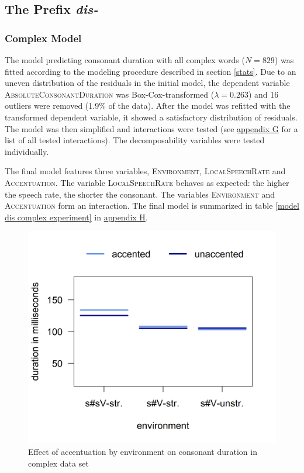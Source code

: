 \subsection{The Prefix \textit{dis-} }


\subsubsection{Complex Model}

The model predicting consonant duration with all complex words ($N=829$) was fitted according to the modeling procedure described in section \ref{stats}. Due to an uneven distribution of the residuals in the initial model, the dependent variable \textsc{AbsoluteConsonantDuration} was Box-Cox-transformed ($\lambda = 0.263$) and 16 outliers were removed (1.9\% of the data). After the model was refitted with the transformed dependent variable, it showed a satisfactory distribution of residuals. The model was then simplified and interactions were tested (see \hyperref[Appendix G Summaries of tested interactions in experimental study]{appendix G} for a list of all tested interactions). The decomposability variables were tested individually.

The final model features three variables, \textsc{Environment}, \textsc{LocalSpeechRate} and \textsc{Accentuation}. The variable \textsc{LocalSpeechRate} behaves as expected: the higher the speech rate, the shorter the consonant. The variables \textsc{Environment} and \textsc{Accentuation} form an interaction. The final model is summarized in table \ref{model dis complex experiment} in \hyperref[Appendix H: Model Summaries Experiment]{appendix H}.






\begin{figure} [t!]
	\centering
	\includegraphics [scale=0.5] {images/Experiment/DisModelInterEnvAcc}
	\caption{Effect of accentuation by environment on consonant duration in complex data set}
	\label{fig:NumNasal disComplex experiment}
\end{figure}




